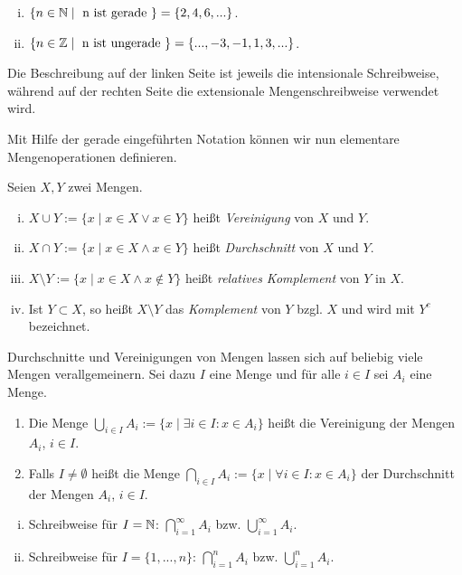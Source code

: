 \begin{example}
    \begin{enumerate}[(i)]
        \item 
        $\{n \in \mathbb{N} \mid \text{ n ist gerade } \} = \{2,4,6,...\}$. 
        \item 
        $\{n \in \mathbb{Z} \mid \text{ n ist ungerade } \} = \{...,-3,-1,1,3,...\}$. 
    \end{enumerate}   
    Die Beschreibung auf der linken Seite ist jeweils die intensionale Schreibweise, während auf der rechten Seite die extensionale Mengenschreibweise verwendet wird. 
\end{example}

Mit Hilfe der gerade eingeführten Notation können wir nun elementare Mengenoperationen definieren. 

\begin{mydef}
    Seien $X,Y$ zwei Mengen. 
    \begin{enumerate}[(i)]
        \item  
        $X \cup Y := \{x \mid x \in X \vee x \in Y\}$ heißt \textit{Vereinigung} von $X$ und $Y$. 
        \item 
        $X \cap Y := \{x \mid x \in X \wedge x \in Y\}$ heißt \textit{Durchschnitt} von $X$ und $Y$. 
        \item 
        $X \setminus Y := \{x \mid x \in X \wedge x \notin Y\}$ heißt \textit{relatives Komplement} von $Y$ in $X$. 
        \item 
        Ist $Y \subset X$, so heißt $X \setminus Y$ das \textit{Komplement} von $Y$ bzgl. $X$ und wird mit $Y^c$ bezeichnet. 
    \end{enumerate}
\end{mydef}

\begin{mydef}
    Durchschnitte und Vereinigungen von Mengen lassen sich auf beliebig viele Mengen verallgemeinern. 
    Sei dazu $I$ eine Menge und für alle $i \in I$ sei $A_i$ eine Menge. 
    \begin{enumerate}
        \item 
        Die Menge $\bigcup_{i \in I}A_i := \{x \mid \exists i \in I: x \in A_i\}$ heißt die Vereinigung der Mengen $A_i$, $i \in I$. 
        \item 
        Falls $I \neq \emptyset$ heißt die Menge $\bigcap_{i \in I}A_i := \{x \mid \forall i \in I: x \in A_i\}$  der Durchschnitt der Mengen $A_i$, $i \in I$.

    \end{enumerate} 
\end{mydef}

\begin{remark}
    \begin{enumerate}[(i)]
        \item 
        Schreibweise für $I = \mathbb{N}$: $\bigcap_{i=1}^{\infty}A_i$ bzw. $\bigcup_{i=1}^{\infty}A_i$.
        \item 
        Schreibweise für $I = \{1,...,n\}$: $\bigcap_{i=1}^n A_i$ bzw. $\bigcup_{i=1}^n A_i$.
    \end{enumerate}
\end{remark}
